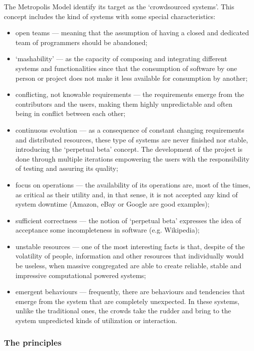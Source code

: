 The Metropolis Model identify its target as the `crowdsourced systems'. This concept includes the kind of systems with some special characteristics:
\begin{itemize}
\item open teams --- meaning that the assumption of having a closed and dedicated team of programmers should be abandoned;
\item `mashability' --- as the capacity of composing and integrating different systems and functionalities since that
the consumption of software by one person or project does not make it less available for consumption by another;
\item conflicting, not knowable requirements --- the requirements emerge from the contributors and the users, making them highly unpredictable and often being in conflict between each other;
\item continuous evolution --- as a consequence of constant changing requirements and distributed resources, these type of systems are never finished nor stable, introducing the `perpetual beta' concept. The development of the project is done through multiple iterations empowering the users with the responsibility of testing and assuring its quality;
\item focus on operations --- the availability of its operations are, most of the times, as critical as their utility and, in that sense, it is not accepted any kind of system downtime (Amazon, eBay or Google are good examples);
\item sufficient correctness --- the notion of `perpetual beta' expresses the idea of acceptance some incompleteness in software (e.g. Wikipedia);
\item unstable resources --- one of the most interesting facts is that, despite of the volatility of people, information and other resources that individually would be useless, when massive congregated are able to create reliable, stable and impressive computational powered systems;
\item emergent behaviours --- frequently, there are behaviours and tendencies that emerge from the system that are completely unexpected. In these systems, unlike the traditional ones, the crowds take the rudder and bring to the system unpredicted kinds of utilization or interaction.
\end{itemize}

\subsubsection{The principles}

